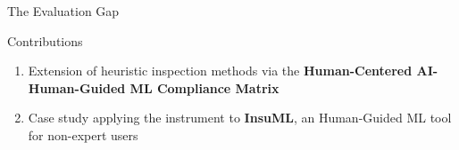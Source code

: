 \documentclass[aspectratio=169,10pt,english,dvipsnames]{beamer}
\begin{document}
\begin{frame}{The Evaluation Gap}
\begin{center}
  \end{center}
  \vspace{1mm}
  \begin{block}{Contributions} \scriptsize
    \begin{enumerate}
      \item Extension of heuristic inspection methods
      via the \textbf{Human-Centered AI-Human-Guided ML Compliance Matrix}
      \item Case study applying the instrument
      to \textbf{InsuML}, an Human-Guided ML tool for non-expert users
    \end{enumerate}
  \end{block}
\end{frame}

\end{document}
